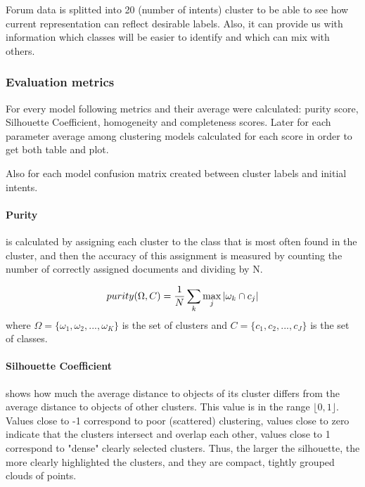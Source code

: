 \documentclass[11pt]{article}
\begin{document}

Forum data is splitted into 20 (number of intents) cluster to be able to see how current representation can reflect desirable labels. Also, it can provide us with information which classes will be easier to identify and which can mix with others.

\subsubsection{Evaluation metrics}

For every model following metrics and their average were calculated: purity score, Silhouette Coefficient, homogeneity and completeness scores. Later for each parameter average among clustering models calculated for each score in order to get both table and plot.

Also for each model confusion matrix created between cluster labels and initial intents.

\paragraph{Purity} is calculated by assigning each cluster to the class that is most often found in the cluster, and then the accuracy of this assignment is measured by counting the number of correctly assigned documents and dividing by N.

\begin{equation}
\centering
purity(\Omega,C) =\frac{1}{N} \sum_{k} \max_{j}|\omega_{k}\cap c_{j}|
\end{equation}
where $\Omega=\{\omega_{1}, \omega_{2}, ... ,\omega_{K}\}$ is the set of clusters and $C = \{c_{1}, c_{2}, ... , c_{J}\}$ is the set of classes. 

\paragraph{Silhouette Coefficient} shows how much the average distance to objects of its cluster differs from the average distance to objects of other clusters. This value is in the range $\lfloor 0, 1\rfloor$. Values close to -1 correspond to poor (scattered) clustering, values close to zero indicate that the clusters intersect and overlap each other, values close to 1 correspond to "dense" clearly selected clusters. Thus, the larger the silhouette, the more clearly highlighted the clusters, and they are compact, tightly grouped clouds of points.
\end{document}

